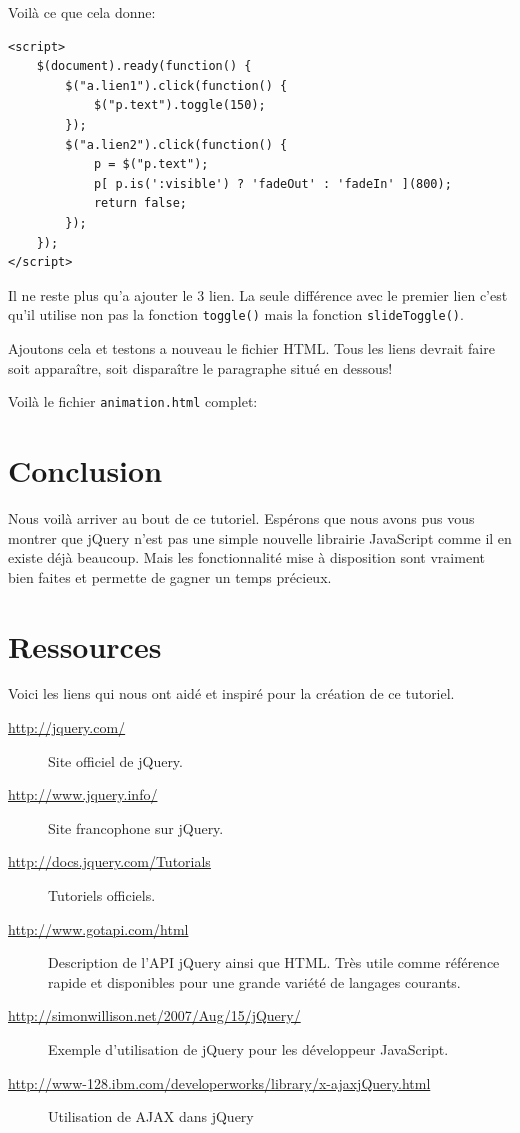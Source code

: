 \documentclass[10pt,a4paper,titlepage]{article}
\begin{document}
Voilà ce que cela donne: 

\begin{lstlisting}
<script>
	$(document).ready(function() {		
		$("a.lien1").click(function() {
			$("p.text").toggle(150);
		});
		$("a.lien2").click(function() {
			p = $("p.text");
		    p[ p.is(':visible') ? 'fadeOut' : 'fadeIn' ](800);
		    return false;
		});	
	});
</script>
\end{lstlisting}

Il ne reste plus qu'a ajouter le 3 lien. La seule différence avec le premier lien c'est qu'il utilise non pas la fonction \texttt{toggle()} mais la fonction \texttt{slideToggle()}.

Ajoutons cela et testons a nouveau le fichier HTML. Tous les liens devrait faire soit apparaître, soit disparaître le paragraphe situé en dessous!

Voilà le fichier \texttt{animation.html} complet: 



\newpage
\section{Conclusion}

Nous voilà arriver au bout de ce tutoriel. Espérons que nous avons pus vous montrer que jQuery n'est pas une simple nouvelle librairie JavaScript comme il en existe déjà beaucoup. Mais les fonctionnalité mise à disposition sont vraiment bien faites et permette de gagner un temps précieux.

 
\section{Ressources}

Voici les liens qui nous ont aidé et inspiré pour la création de ce tutoriel.

\small
\begin{description}
	\item[\url{http://jquery.com/}] Site officiel de jQuery.
	\item[\url{http://www.jquery.info/}] Site francophone sur jQuery.
	\item[\url{http://docs.jquery.com/Tutorials}] Tutoriels officiels.
	\item[\url{http://www.gotapi.com/html}] Description de l'API jQuery ainsi que HTML. Très utile comme référence rapide et disponibles pour une grande variété de langages courants.
	\item[\url{http://simonwillison.net/2007/Aug/15/jQuery/}] Exemple d'utilisation de jQuery pour les développeur JavaScript.
	\item[\url{http://www-128.ibm.com/developerworks/library/x-ajaxjQuery.html}] Utilisation de AJAX dans jQuery
\end{description}
\end{document}
